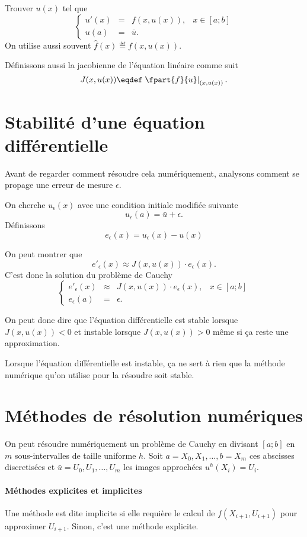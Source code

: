 Trouver $u(x)$ tel que
\[ \left\{ \begin{array}{rclr}
    u'(x) & = & f(x,u(x)), & x \in [a;b]\\
    u(a) & = & \bar{u}.
\end{array} \right. \]
On utilise aussi souvent $\hat{f}(x) \eqdef f(x, u(x))$.

Définissons aussi la jacobienne de l'équation linéaire comme suit
\[ J(x, u(x)) \eqdef \left.\fpart{f}{u}\right|_{(x,u(x))}. \]

\section{Stabilité d'une équation différentielle}
Avant de regarder comment résoudre cela numériquement,
analysons comment se propage une erreur de mesure $\epsilon$.

On cherche $u_\epsilon(x)$ avec une condition initiale modifiée suivante
\[ u_\epsilon(a) = \bar{u} + \epsilon. \]
Définissons
\[ e_\epsilon(x) = u_\epsilon(x) - u(x) \]

On peut montrer que
\[ e'_\epsilon(x) \approx J(x, u(x))\cdot e_\epsilon(x). \]
C'est donc la solution du problème de Cauchy
\[ \left\{ \begin{array}{rclr}
    e'_\epsilon(x) & \approx & J(x, u(x)) \cdot e_\epsilon(x), & x \in [a;b]\\
    e_\epsilon(a) & = & \epsilon.
\end{array} \right. \]

On peut donc dire que l'équation différentielle est stable lorsque
$J(x, u(x)) < 0$ et instable lorsque $J(x, u(x)) > 0$
même si ça reste une approximation.

Lorsque l'équation différentielle est instable, ça ne sert à rien
que la méthode numérique qu'on utilise pour la résoudre soit stable.

\section{Méthodes de résolution numériques}
On peut résoudre numériquement un problème de Cauchy en divisant
$[a;b]$ en $m$ sous-intervalles de taille uniforme $h$.
Soit $a = X_0, X_1, \ldots, b = X_m$ ces abscisses discretisées et
$\bar{u} = U_0, U_1, \ldots, U_m$ les images approchées $u^h(X_i) = U_i$.

\paragraph{Méthodes explicites et implicites}
Une méthode est dite implicite si elle requière le calcul de
$f(X_{i+1},U_{i+1})$ pour approximer $U_{i+1}$.
Sinon, c'est une méthode explicite.

